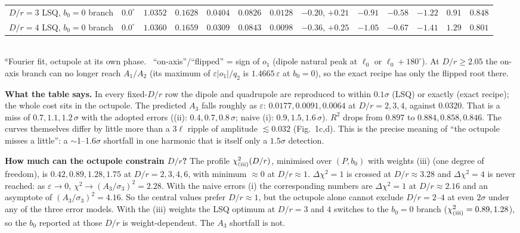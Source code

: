 \documentclass[10pt]{article}
\begin{document}
\begin{center}
\begin{tabular}{lcccccccccccc}
$D/r=3$ LSQ, $b_0{=}0$ branch & $0.0^\circ$ & $1.0352$ & $0.1628$ & $0.0404$ & $0.0826$ & $0.0128$ & $-0.20$, $+0.21$ & $-0.91$ & $-0.58$ & $-1.22$ & $0.91$ & $0.848$\\
$D/r=4$ LSQ, $b_0{=}0$ branch & $0.0^\circ$ & $1.0360$ & $0.1659$ & $0.0309$ & $0.0843$ & $0.0098$ & $-0.36$, $+0.25$ & $-1.05$ & $-0.67$ & $-1.41$ & $1.29$ & $0.801$\\
\bottomrule
\end{tabular}\\[2pt]
{\footnotesize $^a$Fourier fit, octupole at its own phase. \ ``on-axis''/``flipped'' = sign of $o_1$ (dipole natural peak at $\ell_0$ or $\ell_0+180^\circ$).
At $D/r\ge2.05$ the on-axis branch can no longer reach $A_1/A_2$ (its maximum of $\varepsilon|o_1|/q_2$ is $1.4665\,\varepsilon$ at $b_0=0$), so the exact recipe has only the flipped root there.}
\end{center}

\textbf{What the table says.} In every fixed-$D/r$ row the dipole and quadrupole are reproduced to within $0.1\sigma$ (LSQ) or exactly (exact recipe); the whole cost sits in the octupole.
The predicted $A_3$ falls roughly as $\varepsilon$: $0.0177, 0.0091, 0.0064$ at $D/r=2,3,4$, against $0.0320$.
That is a miss of $0.7, 1.1, 1.2\,\sigma$ with the adopted errors ((ii): $0.4, 0.7, 0.8\,\sigma$; naive (i): $0.9, 1.5, 1.6\,\sigma$).
$R^2$ drops from $0.897$ to $0.884, 0.858, 0.846$. The curves themselves differ by little more than a $3\ell$ ripple of amplitude $\lesssim0.032$ (Fig.~1c,d).
This is the precise meaning of ``the octupole misses a little'': a $\sim$1--1.6$\sigma$ shortfall in one harmonic that is itself only a $1.5\sigma$ detection.

\textbf{How much can the octupole constrain $D/r$?} The profile $\chi^2_{\rm (iii)}(D/r)$, minimised over $(P,b_0)$ with weights (iii) (one degree of freedom), is
$0.42, 0.89, 1.28, 1.75$ at $D/r=2,3,4,6$, with minimum $\approx0$ at $D/r\approx1$.
$\Delta\chi^2=1$ is crossed at $D/r\approx3.28$ and $\Delta\chi^2=4$ is never reached: as $\varepsilon\to0$, $\chi^2\to(A_3/\sigma_3)^2=2.28$.
With the naive errors (i) the corresponding numbers are $\Delta\chi^2=1$ at $D/r\approx2.16$ and an asymptote of $(A_3/\sigma_3)^2=4.16$.
So the central values prefer $D/r\approx1$, but the octupole alone cannot exclude $D/r=2$--$4$ at even $2\sigma$ under any of the three error models.
With the (iii) weights the LSQ optimum at $D/r=3$ and $4$ switches to the $b_0=0$ branch ($\chi^2_{\rm (iii)}=0.89, 1.28$), so the $b_0$ reported at those $D/r$ is weight-dependent. The $A_3$ shortfall is not.
\end{document}
